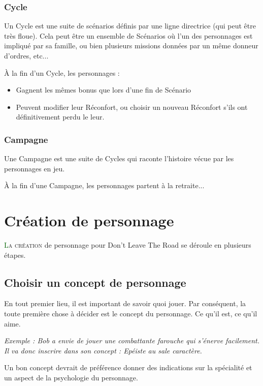 \documentclass[twoside,12pt,english]{book}
\newcommand*\initfamily{\usefont{U}{Acorn}{xl}{n}}
\begin{document}
\subsubsection*{Cycle}

Un Cycle est une suite de scénarios définis par une ligne directrice (qui peut être très floue). Cela peut être un ensemble de Scénarios où l'un des personnages est impliqué par sa famille, ou bien plusieurs missions données par un même donneur d'ordres, etc...

À la fin d'un Cycle, les personnages :

\begin{itemize}
	\item Gagnent les mêmes bonus que lors d'une fin de Scénario
	\item Peuvent modifier leur Réconfort, ou choisir un nouveau Réconfort s'ils ont définitivement perdu le leur.
\end{itemize}

\subsubsection*{Campagne}

Une Campagne est une suite de Cycles qui raconte l'histoire vécue par les personnages en jeu.

À la fin d'une Campagne, les personnages partent à la retraite...

\newpage

\section{Création de personnage}

\lettrine[lines=3]{\initfamily\textcolor{darkgreen}{L}}{a création} de personnage pour Don't Leave The Road se déroule en plusieurs étapes.

\subsection{Choisir un concept de personnage}

En tout premier lieu, il est important de savoir quoi jouer. Par conséquent, la toute première chose à décider est le concept du personnage. Ce qu'il est, ce qu'il aime.

\emph{Exemple : Bob a envie de jouer une combattante farouche qui s'énerve facilement. Il va donc inscrire dans son concept : Epéiste au sale caractère.}

Un bon concept devrait de préférence donner des indications sur la spécialité et un aspect de la psychologie du personnage.
\end{document}
